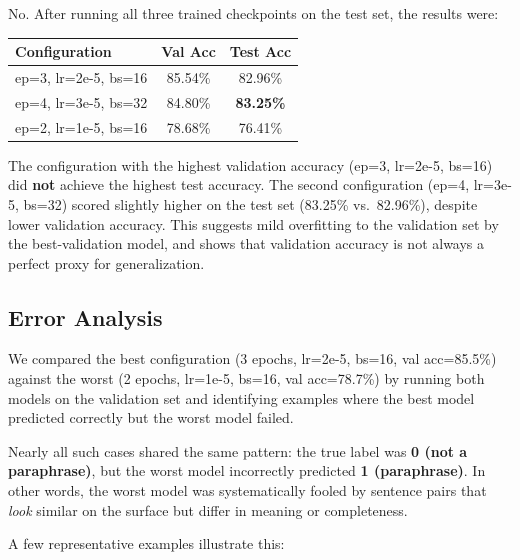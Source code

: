 \documentclass[12pt]{article}
\begin{document}
No. After running all three trained checkpoints on the test set, the results were:

\begin{center}
\begin{tabular}{lcc}
\hline
\textbf{Configuration} & \textbf{Val Acc} & \textbf{Test Acc} \\
\hline
ep=3, lr=2e-5, bs=16 & 85.54\% & 82.96\% \\
ep=4, lr=3e-5, bs=32 & 84.80\% & \textbf{83.25\%} \\
ep=2, lr=1e-5, bs=16 & 78.68\% & 76.41\% \\
\hline
\end{tabular}
\end{center}

The configuration with the highest validation accuracy (ep=3, lr=2e-5, bs=16) did
\textbf{not} achieve the highest test accuracy. The second configuration (ep=4, lr=3e-5,
bs=32) scored slightly higher on the test set (83.25\% vs.\ 82.96\%), despite lower
validation accuracy. This suggests mild overfitting to the validation set by the
best-validation model, and shows that validation accuracy is not always a perfect proxy
for generalization.

\subsection*{Error Analysis}

We compared the best configuration (3 epochs, lr=2e-5, bs=16, val acc=85.5\%) against
the worst (2 epochs, lr=1e-5, bs=16, val acc=78.7\%) by running both models on the
validation set and identifying examples where the best model predicted correctly but the
worst model failed.

Nearly all such cases shared the same pattern: the true label was \textbf{0 (not a
paraphrase)}, but the worst model incorrectly predicted \textbf{1 (paraphrase)}. In other
words, the worst model was systematically fooled by sentence pairs that \textit{look}
similar on the surface but differ in meaning or completeness.

A few representative examples illustrate this:
\end{document}
